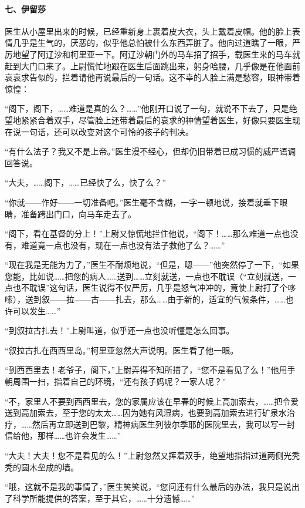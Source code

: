 \paragraph*{七、伊留莎}
\par 医生从小屋里出来的时候，已经重新身上裹着皮大衣，头上戴着皮帽。他的脸上表情几乎是生气的，厌恶的，似乎他总怕被什么东西弄脏了。他向过道瞧了一眼，严厉地望了阿辽沙和柯里亚一下。阿辽沙朝门外的马车招了招手，载医生来的马车就赶到大门口来了。上尉慌忙地跟在医生后面跳出来，躬身哈腰，几乎像是在他面前哀哀求告似的，拦着请他再说最后的一句话。这不幸的人脸上满是愁容，眼神带着惊惶：
\par “阁下，阁下，……难道是真的么？……”他刚开口说了一句，就说不下去了，只是绝望地紧紧合着双手，尽管脸上还带着最后的哀求的神情望着医生，好像只要医生现在说一句话，还可以改变对这个可怜的孩子的判决。
\par “有什么法子？我又不是上帝。”医生漫不经心，但却仍旧带着已成习惯的威严语调回答说。
\par “大夫，……阁下，……已经快了么，快了么？”
\par “你就——作好——一切准备吧。”医生毫不含糊，一字一顿地说，接着就垂下眼睛，准备跨出门口，向马车走去了。
\par “阁下，看在基督的分上！”上尉又惊慌地拦住他说，“阁下！……那么难道一点也没有，难道竟一点也没有，现在一点也没有法子救他了么？……”
\par “现在我是无能为力了，”医生不耐烦地说，“但是，嗯——”他突然停了一下，“如果您能，比如说……把您的病人……送到……立刻就送，一点也不耽误（“立刻就送，一点也不耽误”这句话，医生说得不仅严厉，几乎是怒气冲冲的，竟使上尉打了个哆嗦），送到叙——拉——古——扎去，那么……由于新的，适宜的气候条件，……也许可以发生……”
\par “到叙拉古扎去！”上尉叫道，似乎还一点也没听懂是怎么回事。
\par “叙拉古扎在西西里岛。”柯里亚忽然大声说明。医生看了他一眼。
\par “到西西里去！老爷子，阁下，”上尉弄得不知所措了，“您不是看见了么！”他用手朝周围一扫，指着自己的环境，“还有孩子妈呢？一家人呢？”
\par “不，家里人不要到西西里去，您的家属应该在早春的时候上高加索去，……把令爱送到高加索去，至于您的太太……因为她有风湿病，也要到高加索去进行矿泉水治疗，……然后再立即送到巴黎，精神病医生列彼尔季耶的医院里去，我可以写一封信给他，那样……也许会发生……”
\par “大夫！大夫！您不是看见的么！”上尉忽然又挥着双手，绝望地指指过道两侧光秃秃的圆木垒成的墙。
\par “哦，这就不是我的事情了，”医生笑笑说，“您问还有什么最后的办法，我只是说出了科学所能提供的答案，至于其它，……十分遗憾……”
